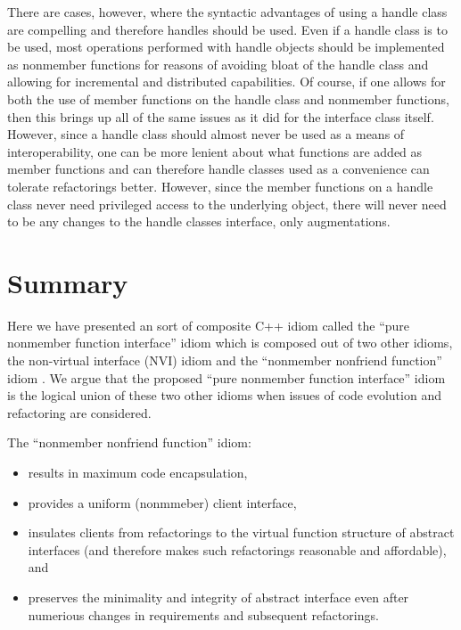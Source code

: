 \documentclass[pdf,ps2pdf,11pt]{SANDreport}
\begin{document}
There are cases, however, where the syntactic advantages of using a handle
class are compelling and therefore handles should be used.  Even if a handle
class is to be used, most operations performed with handle objects should be
implemented as nonmember functions for reasons of avoiding bloat of the handle
class and allowing for incremental and distributed capabilities.  Of course,
if one allows for both the use of member functions on the handle class and
nonmember functions, then this brings up all of the same issues as it did for
the interface class itself.  However, since a handle class should almost never
be used as a means of interoperability, one can be more lenient about what
functions are added as member functions and can therefore handle classes used
as a convenience can tolerate refactorings better.  However, since the member
functions on a handle class never need privileged access to the underlying
object, there will never need to be any changes to the handle classes
interface, only augmentations.

%
\section{Summary}
%

Here we have presented an sort of composite C++ idiom called the ``pure
nonmember function interface'' idiom which is composed out of two other
idioms, the non-virtual interface (NVI) idiom {}\cite[Item
39]{C++CodingStandards05} and the ``nonmember nonfriend function'' idiom
{}\cite[Item 44]{C++CodingStandards05}.  We argue that the proposed ``pure
nonmember function interface'' idiom is the logical union of these two other
idioms when issues of code evolution and refactoring are considered.

The ``nonmember nonfriend function'' idiom:

\begin{itemize}

{}\item results in maximum code encapsulation,

{}\item provides a uniform (nonmmeber) client interface,

{}\item insulates clients from refactorings to the virtual function structure
of abstract interfaces (and therefore makes such refactorings reasonable and
affordable), and

{}\item preserves the minimality and integrity of abstract interface even
after numerious changes in requirements and subsequent refactorings.

\end{itemize}
\end{document}
